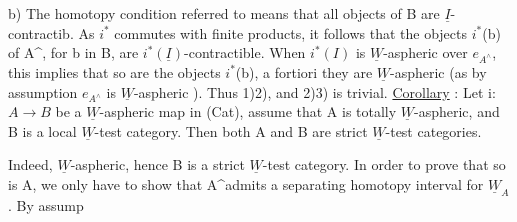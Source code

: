 b)  The homotopy condition  referred to means that all objects of
B are  $\underline{I}$-contractib.  As $i^*$ commutes with finite products,  it follows
that the objects $i^*$(b) of A\^{}, for b in B,  are $i^*(\underline{I})$-contractible.  When
$i^*(I)$ is $\underline{W}$-aspheric over $e_{A^\wedge}$,  this implies that  so are the
objects $i^*$(b),   a fortiori they are  $\underline{W}$-aspheric  (as by assumption
$e_{A^\wedge}$ is $\underline{W}$-aspheric ).  Thus  1)\hand{$\Longrightarrow$}2),  and  2)\hand{$\Longrightarrow$}3)  is trivial.
\uline{Corollary} :  Let  i: $A\to B$ be a $\underline{W}$-aspheric map in (Cat),  assume that
A is totally $\underline{W}$-aspheric,  and B is a local $\underline{W}$-test category.  Then both
A and B are strict $\underline{W}$-test categories.

Indeed,   
 $\underline{W}$-aspheric,  hence B is a
strict $\underline{W}$-test category.  In order to prove that so is A,  we only have
to show that  A\^{}admits a separating homotopy interval for $\underline{W}_A$ .  By assump
